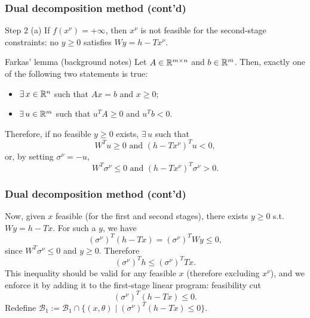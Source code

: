 \documentclass[aspectratio=169]{beamer}
\begin{document}
\begin{frame}
\frametitle{Dual decomposition method (cont'd)}

{\red Step 2 (a)}
If $f(x^{\nu}) = +\infty$, then $x^{\nu}$ is not feasible for the second-stage constraints: no $y \geq 0$ satisfies $Wy = h - Tx^{\nu}$.

\vspace{1mm}

\begin{block}{Farkas' lemma (background notes)}
Let $A \in {\mathbb{R}}^{m \times n}$ and $b \in {\mathbb{R}}^m$.
Then, exactly one of the following two statements is true:
\begin{itemize}
\item
$\exists\, x \in {\mathbb{R}}^n$ such that $Ax = b$ and $x \geq 0$;
\item
$\exists\, u \in {\mathbb{R}}^m$ such that $u^T A \geq 0$ and $u^T b < 0$.
\end{itemize}
\end{block}

\vspace{1mm}

Therefore, if no feasible $y \geq 0$ exists, $\exists\, u$ such that
\[
W^Tu \geq 0 \text{ and } (h - Tx^{\nu})^T u < 0,
\]
or, by setting $\sigma^{\nu} = -u$,
\[
W^T\sigma^{\nu} \leq 0 \text{ and } (h - Tx^{\nu})^T \sigma^{\nu} > 0.
\]

\end{frame}

\begin{frame}
\frametitle{Dual decomposition method (cont'd)}

Now, given $x$ feasible (for the first and second stages), there exists $y \geq 0$ s.t. $Wy = h-Tx$.
For such a $y$, we have
$$
(\sigma^{\nu})^T(h-Tx) = (\sigma^{\nu})^T W y \leq 0,
$$
since $W^T\sigma^{\nu} \leq 0$ and $y \geq 0$.
Therefore
\[
(\sigma^{\nu})^Th \leq (\sigma^{\nu})^TTx.
\]
This inequality should be valid for any feasible $x$ (therefore excluding $x^{\nu}$), and we enforce it by adding it to the first-stage linear program: {\red feasibility cut}
\[
(\sigma^{\nu})^T(h-Tx) \leq 0.
\]
Redefine $\mathcal{B}_1 := \mathcal{B}_1 \cap \lbrace (x, \theta) \mid (\sigma^{\nu})^T(h-Tx) \leq 0 \rbrace$.

\end{frame}
\end{document}
